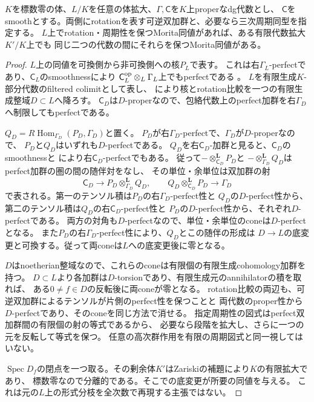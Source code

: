 \begin{lemma}[固定された可換模型へのgeneric降下]\label{rog:lem:descent}
$K$を標数零の体、$L/K$を任意の体拡大、$\Gamma,\mathsf C$を$K$上properなdg代数とし、
$\mathsf C$をsmoothとする。両側にrotationを表す可逆双加群と、必要なら三次周期同型を指定する。
$L$上でrotation・周期性を保つMorita同値があれば、ある有限代数拡大$K'/K$上でも
同じ二つの代数の間にそれらを保つMorita同値がある。
\end{lemma}
\begin{proof}
$L$上の同値を可換側から非可換側への核$P_L$で表す。
これは右$\Gamma_L$-perfectであり、$\mathsf C_L$のsmoothnessにより
$\mathsf C_L^{\rm op}\otimes_L\Gamma_L$上でもperfectである
\cite[Lemma~2.8]{ROGTV}。
$L$を有限生成$K$-部分代数のfiltered colimitとして表し、
\cite[Lemma~2.10]{ROGTV}により核とrotation比較を一つの有限生成整域$D\subset L$へ降ろす。
$\mathsf C_D$は$D$-properなので、包絡代数上のperfect加群を右$\Gamma_D$へ制限してもperfectである。

$Q_D=R\operatorname{Hom}_{\Gamma_D}(P_D,\Gamma_D)$と置く。
$P_D$が右$\Gamma_D$-perfectで、$\Gamma_D$が$D$-properなので、
$P_D$と$Q_D$はいずれも$D$-perfectである。
$Q_D$を右$\mathsf C_D$-加群と見ると、$\mathsf C_D$のsmoothnessと
\cite[Lemma~2.8(2)]{ROGTV}により右$\mathsf C_D$-perfectでもある。
従って$-\otimes_{\mathsf C_D}^{\mathbf L}P_D$と
$-\otimes_{\Gamma_D}^{\mathbf L}Q_D$はperfect加群の圏の間の随伴対をなし、
その単位・余単位は双加群の射
\[
 \mathsf C_D\longrightarrow P_D\otimes_{\Gamma_D}^{\mathbf L}Q_D,
 \qquad Q_D\otimes_{\mathsf C_D}^{\mathbf L}P_D\longrightarrow\Gamma_D
\]
で表される。第一のテンソル積は$P_D$の右$\Gamma_D$-perfect性と
$Q_D$の$D$-perfect性から、第二のテンソル積は$Q_D$の右$\mathsf C_D$-perfect性と
$P_D$の$D$-perfect性から、それぞれ$D$-perfectである。
両方の対角も$D$-perfectなので、単位・余単位のconeは$D$-perfectとなる。
また$P_D$の右$\Gamma_D$-perfect性により、$Q_D$とこの随伴の形成は
$D\to L$の底変更と可換する。従って両coneは$L$への底変更後に零となる。

$D$はnoetherian整域なので、これらのconeは有限個の有限生成cohomology加群を持つ。
$D\subset L$より各加群は$D$-torsionであり、有限生成元のannihilatorの積を取れば、
ある$0\ne f\in D$の反転後に両coneが零となる。
rotation比較の両辺も、可逆双加群によるテンソルが片側のperfect性を保つことと
両代数のproper性から$D$-perfectであり、そのconeを同じ方法で消せる。
指定周期性の図式はperfect双加群間の有限個の射の等式であるから、
必要なら段階を拡大し、さらに一つの元を反転して等式を保つ。
任意の高次群作用を有限の周期図式と同一視してはいない。

$\operatorname{Spec}D_f$の閉点を一つ取る。その剰余体$K'$はZariskiの補題により$K$の有限拡大であり、
標数零なので分離的である。そこでの底変更が所要の同値を与える。
これは元の$L$上の形式分枝を全次数で再現する主張ではない。
\end{proof}


